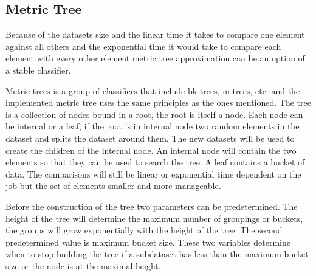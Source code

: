 \subsection{Metric Tree}
Because of the datasets size and the linear time it takes to compare one element against all others and the exponential time it would take to compare each element with every other element metric tree approximation can be an option of a stable classifier. 

Metric trees is a group of classifiers that include bk-trees, m-trees, etc. and the implemented metric tree uses the same principles as the ones mentioned. The tree is a collection of nodes bound in a root, the root is itself a node. Each node can be internal or a leaf, if the root is in internal node two random elements in the dataset and splits the dataset around them. The new datasets will be used to create the children of the internal node. An internal node will contain the two elements so that they can be used to search the tree. A leaf contains a bucket of data. The comparisons will still be linear or exponential time dependent on the job but the set of elements smaller and more manageable.

Before the construction of the tree two parameters can be predetermined. The height of the tree will determine the maximum number of groupings or buckets, the groups will grow exponentially with the height of the tree. The second predetermined value is maximum bucket size. These two variables determine when to stop building the tree if a subdataset has less than the maximum bucket size or the node is at the maximal height.
